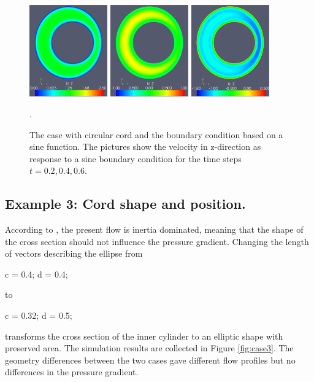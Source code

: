 \begin{figure}\begin{center}
\includegraphics[width=0.3\textwidth]{chapters/hentschel/pdf/sin_sysmax_nmb2.pdf}
\includegraphics[width=0.3\textwidth]{chapters/hentschel/pdf/sin_sysdia_nmb4.pdf}
\includegraphics[width=0.3\textwidth]{chapters/hentschel/pdf/sin_diamin_nmb6.pdf}
\caption{The case with circular cord and the boundary condition based on a
    sine function. The pictures show the velocity in z-direction as response to a sine boundary condition for the time steps $t=0.2, 0.4, 0.6$.}
\label{fig:case2}.
\end{center}\end{figure}





\subsection{Example 3: Cord shape and position.}

According to \citet{LothYardimciAlperin2001,AlperinMazdaLichtorEtAl2006}, the present flow is inertia dominated, meaning that the shape of the cross section should not influence the pressure gradient. Changing the length of vectors describing the ellipse from
\begin{bash}
c = 0.4;
d = 0.4;
\end{bash}
to
\begin{bash}
c = 0.32;
d = 0.5;
\end{bash}
transforms the cross section of the inner cylinder to an elliptic shape with preserved area. The simulation results are collected in Figure \ref{fig:case3}. The geometry differences between the two cases gave different flow profiles but no differences in the pressure gradient.


